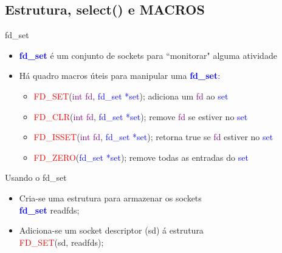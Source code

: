 \documentclass[10pt, xcolor=x11names]{beamer}
\begin{document}
\subsection{Estrutura, select() e MACROS}
\begin{frame}
	\begin{block}{fd\_set}
	
		\begin{itemize}[<+->]
			\item \textcolor{blue}{\textbf{fd\_set}} é um conjunto de sockets para ``monitorar" alguma atividade

			\item Há quadro macros úteis para manipular uma \textcolor{blue}{\textbf{fd\_set}}:
			\begin{itemize}[<+->]
				\item \textcolor{red}{FD\_SET}(\textcolor{purple}{int fd}, \textcolor{blue}{fd\_set *set}); adiciona um \textcolor{purple}{fd} ao \textcolor{blue}{set}

				\item \textcolor{red}{FD\_CLR}(\textcolor{purple}{int fd}, \textcolor{blue}{fd\_set *set}); remove \textcolor{purple}{fd} se estiver no \textcolor{blue}{set}

				\item \textcolor{red}{FD\_ISSET}(\textcolor{purple}{int fd}, \textcolor{blue}{fd\_set *set}); retorna true se \textcolor{purple}{fd} estiver no \textcolor{blue}{set}

				\item \textcolor{red}{FD\_ZERO}(\textcolor{blue}{fd\_set *set}); remove todas as entradas do \textcolor{blue}{set}
			\end{itemize}
		\end{itemize}

	\end{block}
	
\end{frame}


\begin{frame}
	\begin{block}{Usando o fd\_set}
	
		\begin{itemize}[<+->]
			\item Cria-se uma estrutura para armazenar os sockets\\
			\textcolor{blue}{\textbf{fd\_set}} \textcolor[rgb]{.01,.3,.0}{readfds};

			\item Adiciona-se um socket descriptor (sd) á estrutura\\
			 \textcolor{red}{FD\_SET}(sd, \textcolor[rgb]{.01,.3,.0}{readfds});
		\end{itemize}

	\end{block}
	
\end{frame}
\end{document}
